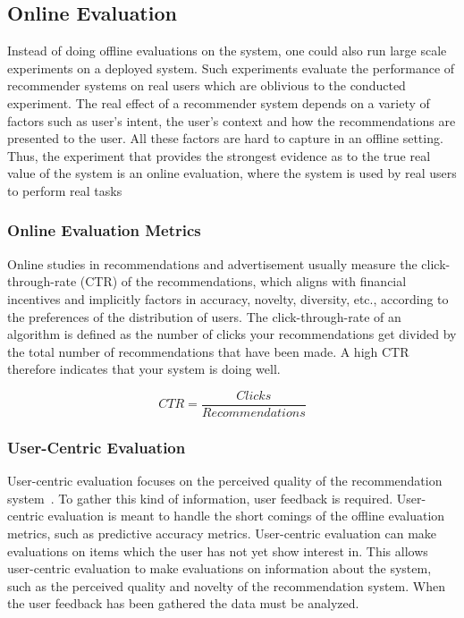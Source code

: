
\subsection{Online Evaluation}

Instead of doing offline evaluations on the system, one could also run large
scale experiments on a deployed system. Such experiments evaluate the
performance of recommender systems on real users which are oblivious to the
conducted experiment. The real effect of a recommender system depends on a
variety of factors such as user’s intent, the user’s context and how the
recommendations are presented to the user. All these factors are hard to
capture in an offline setting. Thus, the experiment that provides the strongest
evidence as to the true real value of the system is an online evaluation, where
the system is used by real users to perform real tasks

\subsubsection{Online Evaluation Metrics}

Online studies in recommendations and advertisement usually measure the
click-through-rate (CTR) of the recommendations, which aligns with financial
incentives and implicitly factors in accuracy, novelty, diversity, etc.,
according to the preferences of the distribution of users.  The
click-through-rate of an algorithm is defined as the number of clicks your
recommendations get divided by the total number of recommendations that have
been made. A high CTR therefore indicates that your system is doing well.

\begin{equation}
CTR = \frac{Clicks}{Recommendations}
\end{equation}


\subsubsection{User-Centric Evaluation}
User-centric evaluation focuses on the perceived quality of the recommendation system~\cite{Pu:2011:UEF:2043932.2043962,Knijnenburg:2011:PPS:2043932.2043993}.
To gather this kind of information, user feedback is required.
User-centric evaluation is meant to handle the short comings of the offline evaluation metrics, such as predictive accuracy metrics.
User-centric evaluation can make evaluations on items which the user has not yet show interest in.
This allows user-centric evaluation to make evaluations on information about the system, such as the perceived quality and novelty of the recommendation system.
When the user feedback has been gathered the data must be analyzed.


